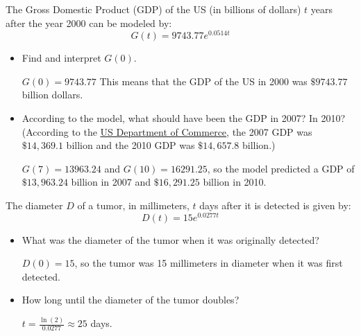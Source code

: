 \documentclass{ximera}
\begin{document}
\begin{problem}
    The Gross Domestic Product (GDP) of the US (in billions of dollars) $t$ years after the year 2000 can be modeled by: \[ G(t) = 9743.77 e^{0.0514t}\]

\begin{itemize}
\item
    Find and interpret $G(0)$.

\begin{solution}
    $G(0) = 9743.77$  This means that the GDP of the US in 2000 was $\$9743.77$ billion dollars.
\end{solution}
    
\item 
    According to the model, what should have been the GDP in 2007?  In 2010?  (According to the   \href{http://1.usa.gov/iimT40}{\underline{US Department of Commerce}}, the 2007 GDP was $\$14,369.1$ billion and the 2010 GDP was $\$14,657.8$ billion.)

\begin{solution}
    $G(7) = 13963.24$ and $G(10) = 16291.25$, so the model predicted a GDP of $\$ 13,963.24$ billion in 2007 and $\$ 16,291.25$ billion in 2010.
\end{solution}

\end{itemize}
    
\end{problem}


\begin{problem}
    The diameter $D$ of a tumor, in millimeters, $t$ days after it is detected is given by:  \[D(t) = 15e^{0.0277t} \]

\begin{itemize}
    \item 
    What was the diameter of the tumor when it was originally detected?

\begin{solution}
    $D(0) = 15$, so the tumor was 15 millimeters in diameter when it was first detected.
\end{solution}
    
\item 
    How long until the diameter of the tumor doubles?

\begin{solution}
    $t = \frac{\ln(2)}{0.0277} \approx 25$ days.
\end{solution}
    
\end{itemize}
    
\end{problem}  
\end{document}

